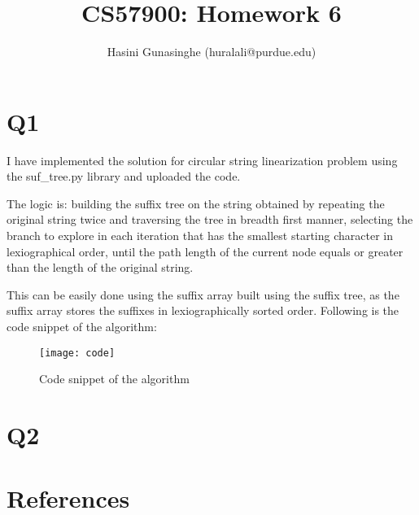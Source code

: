 \documentclass[11pt]{article}
\title{
\vspace{-20.mm}
CS57900: Homework 6}
\author{Hasini Gunasinghe (huralali@purdue.edu)}
\date{}
\begin{document}
\maketitle

\section*{Q1}
I have implemented the solution for circular string linearization problem using the suf\_tree.py library and uploaded the code.

The logic is: building the suffix tree on the string obtained by repeating the original string twice and traversing the tree in breadth first manner,
selecting the branch to explore in each iteration that has the smallest starting character in lexiographical order, until the path length of the current node
equals or greater than the length of the original string.

This can be easily done using the suffix array built using the suffix tree, as the suffix array stores the suffixes in lexiographically sorted order.
Following is the code snippet of the algorithm:

\begin{figure}[H]
\centering
\texttt{[image: code]}
\caption{Code snippet of the algorithm}
\label{example}
\end{figure}


\pagebreak

\section*{Q2}

\pagebreak
\section*{References}
\end{document}
